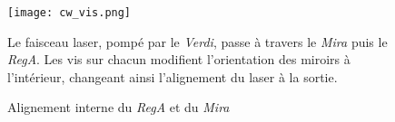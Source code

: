 \begin{enumerate}
        \begin{figure}[H]
        \begin{center} \texttt{[image: cw\_vis.png]} \end{center}
        \caption{Alignement interne du \textit{RegA} et du \textit{Mira}}
        \begin{footnotesize} Le faisceau laser, pompé par le \textit{Verdi}, passe à travers le \textit{Mira} puis le \textit{RegA}. Les vis sur chacun modifient l'orientation des miroirs à l'intérieur, changeant ainsi l'alignement du laser à la sortie. \end{footnotesize}
        \label{fig:cw_vis}
        \end{figure}
\end{enumerate}